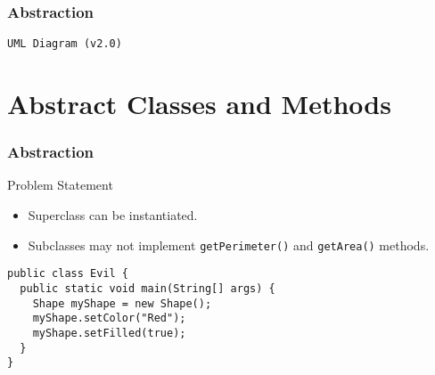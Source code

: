 \documentclass[10pt, compress]{beamer}
\begin{document}
\begin{frame}[fragile]
  \frametitle{Abstraction}
  \begin{block}{\texttt{UML Diagram (v2.0)}}
  \begin{figure}
  \centering
  \end{figure}
  \end{block}
\end{frame}

\section{Abstract Classes and Methods}

\begin{frame}[fragile]
  \frametitle{Abstraction}
  \begin{block}{Problem Statement}
    \begin{itemize}
      \item[] Superclass can be instantiated.
      \item[] Subclasses may not implement \texttt{getPerimeter()} and \texttt{getArea()} methods.
    \end{itemize}
    \begin{verbatim}
public class Evil {
  public static void main(String[] args) {
    Shape myShape = new Shape();
    myShape.setColor("Red");
    myShape.setFilled(true);
  }
}
    \end{verbatim}
  \end{block}
\end{frame}
\end{document}
